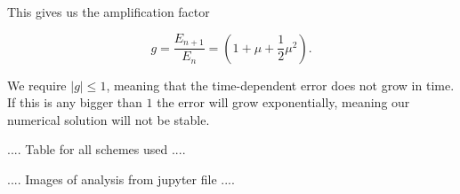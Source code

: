 \documentclass{article}
\begin{document}
This gives us the amplification factor 

\begin{equation}
    g = \frac{E_{n+1}}{E_n} = \left( 1 + \mu + \frac{1}{2}\mu^2  \right).
\end{equation}

We require $|g|\leq 1$, meaning that the time-dependent error does not grow in time. If this is any bigger than $1$ the error will grow exponentially, meaning our numerical solution will not be stable.

.... Table for all schemes used ....


.... Images of analysis from jupyter file ....











\end{document}
